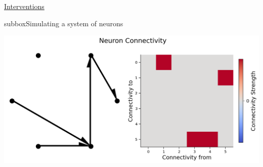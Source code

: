 \begin{textbox}{\href{https://compneuro.neuromatch.io/tutorials/W3D5_NetworkCausality/student/W3D5_Tutorial1.html}{Interventions }   }
\begin{subbox}{subbox}{Simulating a system of neurons}
\begin{center}
\includegraphics[scale=0.25]{Figures/NC/NC_Figure1.png}
\end{center}
\end{subbox}
\end{textbox}

